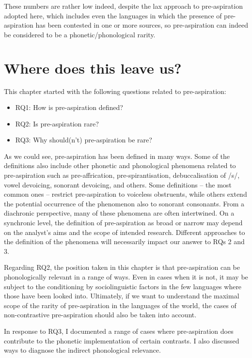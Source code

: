 \documentclass[output=paper]{langscibook}
\begin{document}
These numbers are rather low indeed, despite the lax approach to pre\hyp aspiration adopted here, which includes even the languages in which the presence of pre\hyp aspiration has been contested in one or more sources, so pre\hyp aspiration can indeed be considered to be a phonetic/phonological rarity. 

\section{Where does this leave us?}\label{sec:hejna:6}

This chapter started with the following questions related to pre-aspiration:

\begin{itemize}
\item RQ1: How is pre\hyp aspiration defined?
\item RQ2: Is pre\hyp aspiration rare?
\item RQ3: Why should(n’t) pre\hyp aspiration be rare?
\end{itemize}

As we could see, pre\hyp aspiration has been defined in many ways. Some of the definitions also include other phonetic and phonological phenomena related to pre\hyp aspiration such as pre-affrication, pre-spirantisation, debuccalisation of /s/, vowel devoicing, sonorant devoicing, and others. Some definitions – the most common ones – restrict pre\hyp aspiration to voiceless obstruents, while others extend the potential occurrence of the phenomenon also to sonorant consonants. From a diachronic perspective, many of these phenomena are often intertwined. On a synchronic level, the definition of pre\hyp aspiration as broad or narrow may depend on the analyst’s aims and the scope of intended research. Different approaches to the definition of the phenomena will necessarily impact our answer to RQs 2 and 3.

Regarding RQ2, the position taken in this chapter is that pre\hyp aspiration can be phonologically relevant in a range of ways. Even in cases when it is not, it may be subject to the conditioning by sociolinguistic factors in the few languages where those have been looked into. Ultimately, if we want to understand the maximal scope of the rarity of pre\hyp aspiration in the languages of the world, the cases of non-contrastive pre\hyp aspiration should also be taken into account.

In response to RQ3, I documented a range of cases where pre\hyp aspiration does contribute to the phonetic implementation of certain contrasts. I also discussed ways to diagnose the indirect phonological relevance. 
\end{document}
